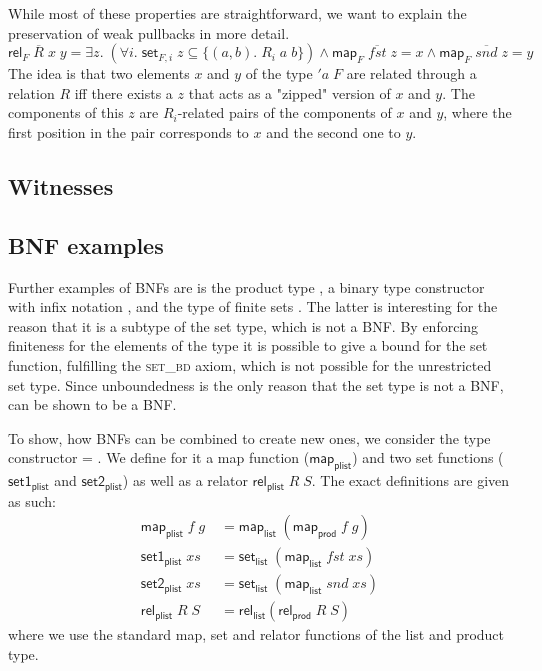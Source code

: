       While most of these properties are straightforward, we want to explain the preservation of weak pullbacks in more detail.
      \begin{equation}
        \textsf{rel}_F\; \overline{R}\; x\; y = 
          \exists z.\; (\forall i.\; \textsf{set}_{F,i}\; z \subseteq \{(a, b).\; R_i\; a\; b \}) \land 
          \textsf{map}_F\; \overline{fst}\; z = x \land \textsf{map}_F\; \overline{snd}\; z = y \label{eq:WP}
      \end{equation}
      The idea is that two elements $x$ and $y$ of the type $'a\; F$ are related through a relation $R$ iff there exists a $z$ that acts as a "zipped" version of $x$ and $y$. The components of this $z$ are $R_i$-related pairs of the components of $x$ and $y$, where the first position in the pair corresponds to $x$ and the second one to $y$.

    \subsection{Witnesses}
      
    \subsection{BNF examples}
      Further examples of \acp{BNF} are is the product type , a binary type constructor with infix notation , and the type of finite sets . The latter is interesting for the reason that it is a subtype of the set type, which is not a \ac{BNF}. By enforcing finiteness for the elements of the type it is possible to give a bound for the set function, fulfilling the \textsc{set\_bd} axiom, which is not possible for the unrestricted set type. Since unboundedness is the only reason that the set type is not a \ac{BNF},  can be shown to be a \ac{BNF}.
      
      To show, how \acp{BNF} can be combined to create new ones, we consider the type constructor  = . We define for it a map function ($\textsf{map}_\textsf{plist}$) and two set functions ($\textsf{set1}_\textsf{plist}$ and $\textsf{set2}_\textsf{plist}$) as well as a relator $\textsf{rel}_\textsf{plist}\; R\; S$. The exact definitions are given as such:
      \begin{align*}
        \textsf{map}_\textsf{plist}\; f\; g\; &= \textsf{map}_\textsf{list}\; (\textsf{map}_\textsf{prod}\; f\; g)\\
        \textsf{set1}_\textsf{plist}\; xs &= \textsf{set}_\textsf{list}\; (\textsf{map}_\textsf{list}\; fst\; xs)\\
        \textsf{set2}_\textsf{plist}\; xs &= \textsf{set}_\textsf{list}\; (\textsf{map}_\textsf{list}\; snd\; xs)\\
        \textsf{rel}_\textsf{plist}\; R\; S &= \textsf{rel}_\textsf{list} (\textsf{rel}_\textsf{prod}\; R\; S)
      \end{align*}
      \noindent where we use the standard map, set and relator functions of the list and product type.

